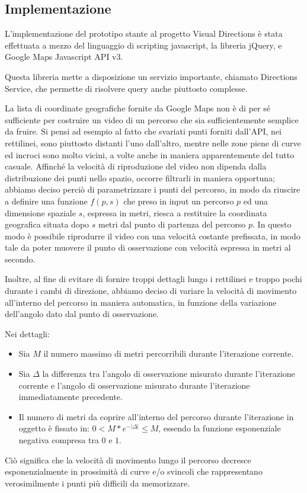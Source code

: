 \documentclass[12pt,a4paper,openright, notitlepage]{report}
\begin{document}
\subsection{Implementazione}

L’implementazione del prototipo stante al progetto Visual Directions è stata effettuata a mezzo del linguaggio di scripting javascript, la libreria jQuery, e Google Maps Javascript API v3.

Questa libreria mette a disposizione un servizio importante, chiamato Directions Service, che permette di risolvere query anche piuttosto complesse.

La lista di coordinate geografiche fornite da Google Maps non è di per sé sufficiente per costruire un video di un percorso che sia sufficientemente semplice da fruire. Si pensi ad esempio al fatto che svariati punti forniti dall’API, nei rettilinei, sono piuttosto distanti l’uno dall’altro, mentre nelle zone piene di curve ed incroci sono molto vicini, a volte anche in maniera apparentemente del tutto casuale. Affinché la velocità di riproduzione del video non dipenda dalla distribuzione dei punti nello spazio, occorre filtrarli in maniera opportuna; abbiamo deciso perciò di parametrizzare i punti del percorso, in modo da riuscire a definire una funzione $f(p, s)$ che preso in input un percorso $p$ ed una dimensione spaziale $s$, espressa in metri, riesca a restituire la coordinata geografica situata dopo $s$ metri dal punto di partenza del percorso $p$. In questo modo è possibile riprodurre il video con una velocità costante prefissata, in modo tale da poter muovere il punto di osservazione con velocità espressa in metri al secondo. 

Inoltre, al fine di evitare di fornire troppi dettagli lungo i rettilinei e troppo pochi durante i cambi di direzione, abbiamo deciso di variare la velocità di movimento all’interno del percorso in maniera automatica, in funzione della variazione dell’angolo dato dal punto di osservazione.

Nei dettagli: 

\begin{itemize}
	\item Sia $M$ il numero massimo di metri percorribili durante l’iterazione corrente. 
	\item Sia $\Delta$ la differenza tra l’angolo di osservazione misurato durante l’iterazione corrente e l’angolo di osservazione misurato durante l’iterazione immediatamente precedente.
	\item Il numero di metri da coprire all’interno del percorso durante l’iterazione in oggetto è fissato in: $0 < M * e^{-|\Delta|} \le M$, essendo la funzione esponenziale negativa compresa tra $0$ e $1$.
\end{itemize}
Ciò significa che la velocità di movimento lungo il percorso decresce esponenzialmente in prossimità di curve e/o svincoli che rappresentano verosimilmente i punti più difficili da memorizzare.
\end{document}
